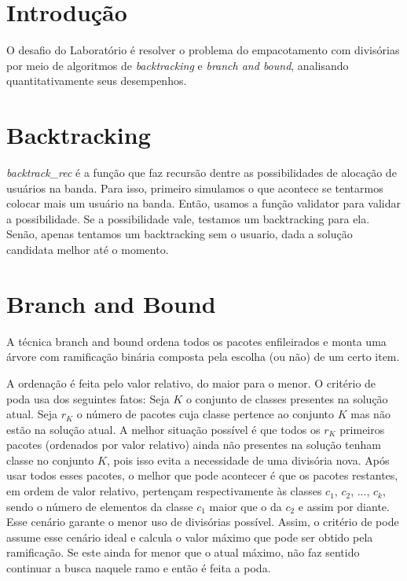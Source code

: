\documentclass[7pt]{article}
\newcommand{\tit}[1]{\textit{#1}}
\begin{document}
\begin{multicols}{2}

\section{Introdução}
O desafio do Laboratório é resolver o problema do empacotamento com divisórias
por meio de algoritmos de \tit{backtracking} e \tit{branch and bound},
analisando quantitativamente seus desempenhos.

\section{Backtracking}
\tit{backtrack\_rec} é a função que faz recursão dentre as possibilidades de alocação de usuários na banda. Para isso, primeiro simulamos o que acontece se tentarmos colocar mais um usuário na banda. Então, usamos a função validator para validar a possibilidade.
Se a possibilidade vale, testamos um backtracking para ela.
Senão, apenas tentamos um backtracking sem o usuario, dada a solução candidata melhor até o momento.

\section{Branch and Bound}
A técnica branch and bound ordena todos os pacotes enfileirados e monta uma
árvore com ramificação binária composta pela escolha (ou não) de um certo item.

A ordenação é feita pelo valor relativo, do maior para o menor.
O critério de poda usa dos seguintes fatos:
Seja $K$ o conjunto de classes presentes na solução atual.
Seja $r_K$ o número de pacotes cuja classe pertence ao conjunto $K$ mas não
estão na solução atual.
A melhor situação possível é que todos os $r_K$ primeiros pacotes (ordenados
por valor relativo) ainda não presentes na solução tenham classe no conjunto
$K$, pois isso evita a necessidade de uma divisória nova.
Após usar todos esses pacotes, o melhor que pode acontecer é que os pacotes
restantes, em ordem de valor relativo, pertençam respectivamente às
classes $c_1$, $c_2$, ..., $c_k$, sendo o número de elementos da classe
$c_1$ maior que o da $c_2$ e assim por diante.
Esse cenário garante o menor uso de divisórias possível.
Assim, o critério de pode assume esse cenário ideal e calcula o valor
máximo que pode ser obtido pela ramificação.
Se este ainda for menor que o atual máximo, não faz sentido continuar a
busca naquele ramo e então é feita a poda.


\end{multicols}
\end{document}
